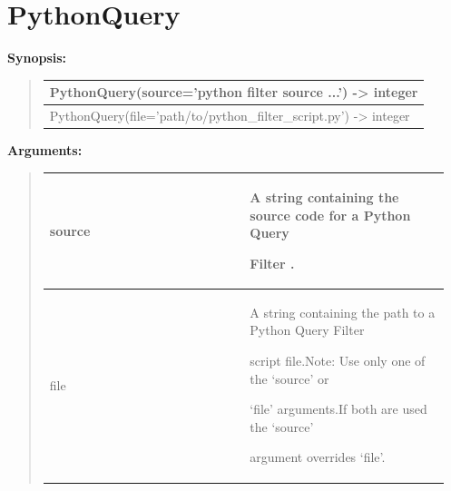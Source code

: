 \documentclass[letterpaper,10pt,english]{sphinxmanual}
\begin{document}
\section{PythonQuery}
\label{functions:pythonquery}
\begin{DUlineblock}{0em}
\item[] \textbf{Synopsis:}
\end{DUlineblock}
\begin{quote}

\begin{tabulary}{\linewidth}{|L|}
\hline

PythonQuery(source='python filter source ...') -\textgreater{} integer
\\
\hline
PythonQuery(file='path/to/python\_filter\_script.py') -\textgreater{} integer
\\
\hline\end{tabulary}

\end{quote}

\begin{DUlineblock}{0em}
\item[] 
\item[] \textbf{Arguments:}
\end{DUlineblock}
\begin{quote}

\begin{tabular}{|p{0.475\linewidth}|p{0.475\linewidth}|}
\hline

source
 & 
\begin{DUlineblock}{0em}
\item[] A string containing the source code for a Python Query
\item[] Filter .
\end{DUlineblock}
\\
\hline
file
 & 
\begin{DUlineblock}{0em}
\item[] A string containing the path to a Python Query Filter
\item[] script file.Note: Use only one of the `source' or
\item[] `file' arguments.If both are used the `source'
\item[] argument overrides `file'.
\end{DUlineblock}
\\
\hline\end{tabular}

\end{quote}
\end{document}
